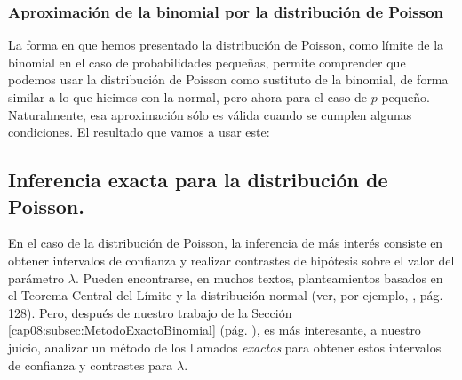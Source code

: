 \subsubsection{Aproximación de la binomial por la distribución de Poisson}\label{cap08:subsubsec:AproximacionBinomialPorPoisson}

La forma en que hemos presentado la distribución de Poisson, como límite de la binomial en el caso
de probabilidades pequeñas, permite comprender que podemos usar la distribución de Poisson como
sustituto de la binomial, de forma similar a lo que hicimos con la normal, pero ahora para el caso
de $p$ pequeño. Naturalmente, esa aproximación sólo es válida cuando se cumplen algunas
condiciones. El resultado que vamos a usar este:
    \begin{center}
    \end{center}

\subsection{Inferencia exacta para la distribución de Poisson.}
\label{cap08:subsec:InferenciaPoisson}

En el caso de la distribución de Poisson, la inferencia de más interés consiste en obtener
intervalos de confianza y realizar contrastes de hipótesis sobre el valor del parámetro $\lambda$.
Pueden encontrarse, en muchos textos, planteamientos basados en el Teorema Central del Límite y la
distribución normal (ver, por ejemplo, \cite{garcia2009estadistica}, pág. 128). Pero, después de nuestro trabajo de la Sección \ref{cap08:subsec:MetodoExactoBinomial} (pág. \pageref{cap08:subsec:MetodoExactoBinomial}), es más interesante, a nuestro juicio, analizar un método de los llamados {\em exactos} para obtener estos intervalos de confianza y contrastes para $\lambda$.

